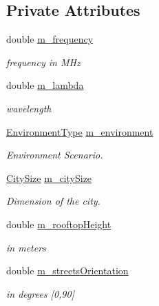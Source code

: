 \subsection*{Private Attributes}
\begin{DoxyCompactItemize}
\item 
double \hyperlink{classns3_1_1ItuR1411NlosOverRooftopPropagationLossModel_a9849dc5d7532df7160aa171f3e20d8b7}{m\+\_\+frequency}
\begin{DoxyCompactList}\small\item\em frequency in M\+Hz \end{DoxyCompactList}\item 
double \hyperlink{classns3_1_1ItuR1411NlosOverRooftopPropagationLossModel_ada44335d5ed036f43b68194cbbcc61f7}{m\+\_\+lambda}
\begin{DoxyCompactList}\small\item\em wavelength \end{DoxyCompactList}\item 
\hyperlink{group__propagation_ga0e392ed771a28c92112047e63308a53a}{Environment\+Type} \hyperlink{classns3_1_1ItuR1411NlosOverRooftopPropagationLossModel_a90b4674c71607edfaeeac8e473cd56ab}{m\+\_\+environment}
\begin{DoxyCompactList}\small\item\em Environment Scenario. \end{DoxyCompactList}\item 
\hyperlink{group__propagation_ga29c9a1b1a58b6a56054ff5ea4c5a574d}{City\+Size} \hyperlink{classns3_1_1ItuR1411NlosOverRooftopPropagationLossModel_a875ce5ba78aa17e94efc01cc4290e299}{m\+\_\+city\+Size}
\begin{DoxyCompactList}\small\item\em Dimension of the city. \end{DoxyCompactList}\item 
double \hyperlink{classns3_1_1ItuR1411NlosOverRooftopPropagationLossModel_a89f418813f34698cfbe4b0b67f01656d}{m\+\_\+rooftop\+Height}
\begin{DoxyCompactList}\small\item\em in meters \end{DoxyCompactList}\item 
double \hyperlink{classns3_1_1ItuR1411NlosOverRooftopPropagationLossModel_afe49e3b96fa44206627dc5bd6f5cb80f}{m\+\_\+streets\+Orientation}
\begin{DoxyCompactList}\small\item\em in degrees \mbox{[}0,90\mbox{]} \end{DoxyCompactList}\item 

\end{DoxyCompactItemize}
